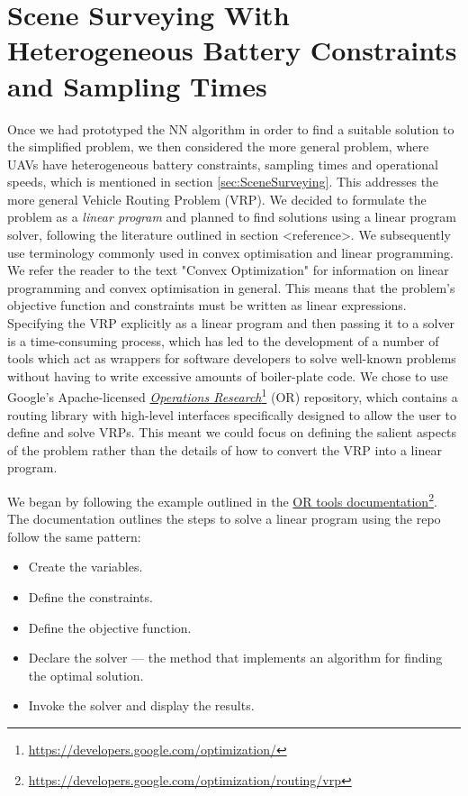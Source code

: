 \section{Scene Surveying With Heterogeneous Battery Constraints and Sampling Times}

Once we had prototyped the NN algorithm in order to find a suitable solution to the simplified problem, we then considered the more general problem, where UAVs have heterogeneous battery constraints, sampling times and operational speeds, which is mentioned in section \ref{sec:SceneSurveying}. This addresses the more general Vehicle Routing Problem (VRP). We decided to formulate the problem as a \textit{linear program} and planned to find solutions using a linear program solver, following the literature outlined in section <reference>. We subsequently use terminology commonly used in convex optimisation and linear programming. We refer the reader to the text "Convex Optimization" \cite{Boyd2004ConvexOptimization} for information on linear programming and convex optimisation in general. This means that the problem's objective function and constraints must be written as linear expressions.
Specifying the VRP explicitly as a linear program and then passing it to a solver is a time-consuming process, which has led to the development of a number of tools which act as wrappers for software developers to solve well-known problems without having to write excessive amounts of boiler-plate code. We chose to use Google's Apache-licensed \href{https://developers.google.com/optimization/}{\textit{Operations Research}}\footnote{\href {https://developers.google.com/optimization/}{https://developers.google.com/optimization/}} (OR) repository, which contains a routing library with high-level interfaces specifically designed to allow the user to define and solve VRPs. This meant we could focus on defining the salient aspects of the problem rather than the details of how to convert the VRP into a linear program.

We began by following the example outlined in the \href{https://developers.google.com/optimization/routing/vrp}{OR tools documentation}\footnote{\href {https://developers.google.com/optimization/routing/vrp}{https://developers.google.com/optimization/routing/vrp}}. The documentation outlines the steps to solve a linear program using the repo follow the same pattern: 
\begin{itemize}
\item Create the variables.
\item Define the constraints.
\item Define the objective function.
\item Declare the solver — the method that implements an algorithm for finding the optimal solution.
\item Invoke the solver and display the results.
\end{itemize}


